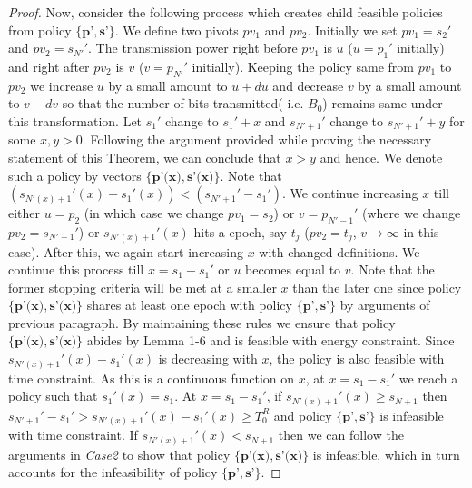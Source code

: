 \begin{proof}
Now, consider the following process which creates child feasible policies from policy $\{\textbf{p'},\textbf{s'}\}$. We define two pivots $pv_1$ and $pv_2$. Initially we set $pv_1=s_2'$ and $pv_2=s_{N'}'$. The transmission power right before $pv_1$ is $u$ ($u=p_1'$ initially) and right after $pv_2$ is $v$ ($v=p_{N'}'$ initially). Keeping the policy same from $pv_1$ to $pv_2$ we increase $u$ by a small amount to $u+du$ and decrease $v$ by a small amount to $v-dv$ so that the number of bits transmitted( i.e. $B_0$) remains same under this transformation. Let $s_1'$ change to $s_1'+x$ and $s_{N'+1}'$ change to $s_{N'+1}'+y$ for some $x,y>0$. Following the argument provided while proving the necessary statement of this Theorem, we can conclude that $x>y$ and hence. We denote such a policy by vectors $\{\textbf{p'(x)},\textbf{s'(x)}\}$. Note that $(s_{N'(x)+1}'(x)-s_1'(x))<(s_{N'+1}'-s_1')$. We continue increasing $x$ till either $u=p_2$ (in which case we change $pv_1=s_2$) or $v=p_{N'-1}'$ (where we change $pv_2=s_{N'-1}'$) or $s_{N'(x)+1}'(x)$ hits a epoch, say $t_j$ ($pv_2=t_j$, $v\rightarrow\infty$ in this case). After this, we again start increasing $x$ with changed definitions. We continue this process till $x=s_1-s_1'$  or $u$ becomes equal to $v$. Note that the former stopping criteria will be met at a smaller $x$ than the later one since policy $\{\textbf{p'(x)},\textbf{s'(x)}\}$ shares at least one epoch with policy $\{\textbf{p'},\textbf{s'}\}$ by arguments of previous paragraph. By maintaining these rules we ensure that policy $\{\textbf{p'(x)},\textbf{s'(x)}\}$ abides by Lemma 1-6 and is feasible with energy constraint. Since $s_{N'(x)+1}'(x)-s_1'(x)$ is decreasing with $x$, the policy is also feasible with time constraint. As this is a continuous function on $x$, at $x=s_1-s_1'$ we reach a policy such that $s_1'(x)=s_1$. At $x=s_1-s_1'$, if $s_{N'(x)+1}'(x)\ge s_{N+1}$ then $s_{N'+1}'-s_1'>s_{N'(x)+1}'(x)-s_1'(x)\ge T^R_0$ and policy $\{\textbf{p'},\textbf{s'}\}$ is infeasible with time constraint. If $s_{N'(x)+1}'(x)< s_{N+1}$ then we can follow the arguments in \textit{Case2} to show that policy $\{\textbf{p'(x)},\textbf{s'(x)}\}$ is infeasible, which in turn accounts for the infeasibility of policy $\{\textbf{p'},\textbf{s'}\}$.
\end{proof}

























